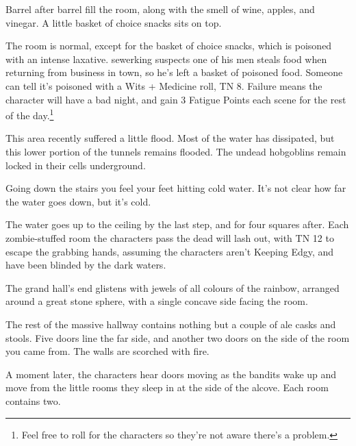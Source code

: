 
\begin{boxtext}

	Barrel after barrel fill the room, along with the smell of wine, apples, and vinegar.  A little basket of choice snacks sits on top.

\end{boxtext}

The room is normal, except for the basket of choice snacks, which is poisoned with an intense laxative.  \Gls{sewerking} suspects one of his men steals food when returning from business in town, so he's left a basket of poisoned food.  Someone can tell it's poisoned with a Wits + Medicine roll, TN 8.  Failure means the character will have a bad night, and gain 3 Fatigue Points each scene for the rest of the day.\footnote{Feel free to roll for the characters so they're not aware there's a problem.}


This area recently suffered a little flood.  Most of the water has dissipated, but this lower portion of the tunnels remains flooded.  The undead hobgoblins remain locked in their cells underground.


\begin{boxtext}
	Going down the stairs you feel your feet hitting cold water.  It's not clear how far the water goes down, but it's cold.
\end{boxtext}

The water goes up to the ceiling by the last step, and for four squares after.  Each zombie-stuffed room the characters pass the dead will lash out, with TN 12 to escape the grabbing hands, assuming the characters aren't Keeping Edgy, and have been blinded by the dark waters.



\begin{boxtext}
	The grand hall's end glistens with jewels of all colours of the rainbow, arranged around a great stone sphere, with a single concave side facing the room.

	The rest of the massive hallway contains nothing but a couple of ale casks and stools.  Five doors line the far side, and another two doors on the side of the room you came from.  The walls are scorched with fire.

\end{boxtext}

A moment later, the characters hear doors moving as the bandits wake up and move from the little rooms they sleep in at the side of the alcove.  Each room contains two.

